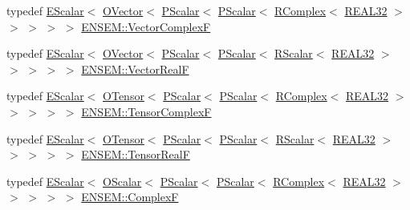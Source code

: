 \begin{DoxyCompactItemize}
\item 
typedef \mbox{\hyperlink{classENSEM_1_1EScalar}{E\+Scalar}}$<$ \mbox{\hyperlink{classENSEM_1_1OVector}{O\+Vector}}$<$ \mbox{\hyperlink{classENSEM_1_1PScalar}{P\+Scalar}}$<$ \mbox{\hyperlink{classENSEM_1_1PScalar}{P\+Scalar}}$<$ \mbox{\hyperlink{classENSEM_1_1RComplex}{R\+Complex}}$<$ \mbox{\hyperlink{namespaceENSEM_a7540d01191172323e9073283d772576d}{R\+E\+A\+L32}} $>$ $>$ $>$ $>$ $>$ \mbox{\hyperlink{group__defs_ga6a0a527d27235e5a8e8f28342eb7676f}{E\+N\+S\+E\+M\+::\+Vector\+ComplexF}}
\item 
typedef \mbox{\hyperlink{classENSEM_1_1EScalar}{E\+Scalar}}$<$ \mbox{\hyperlink{classENSEM_1_1OVector}{O\+Vector}}$<$ \mbox{\hyperlink{classENSEM_1_1PScalar}{P\+Scalar}}$<$ \mbox{\hyperlink{classENSEM_1_1PScalar}{P\+Scalar}}$<$ \mbox{\hyperlink{classENSEM_1_1RScalar}{R\+Scalar}}$<$ \mbox{\hyperlink{namespaceENSEM_a7540d01191172323e9073283d772576d}{R\+E\+A\+L32}} $>$ $>$ $>$ $>$ $>$ \mbox{\hyperlink{group__defs_gaa81b1a62c5846ad0db2fe60ff8f1e1b3}{E\+N\+S\+E\+M\+::\+Vector\+RealF}}
\item 
typedef \mbox{\hyperlink{classENSEM_1_1EScalar}{E\+Scalar}}$<$ \mbox{\hyperlink{classENSEM_1_1OTensor}{O\+Tensor}}$<$ \mbox{\hyperlink{classENSEM_1_1PScalar}{P\+Scalar}}$<$ \mbox{\hyperlink{classENSEM_1_1PScalar}{P\+Scalar}}$<$ \mbox{\hyperlink{classENSEM_1_1RComplex}{R\+Complex}}$<$ \mbox{\hyperlink{namespaceENSEM_a7540d01191172323e9073283d772576d}{R\+E\+A\+L32}} $>$ $>$ $>$ $>$ $>$ \mbox{\hyperlink{group__defs_ga7bcf210bf1e9c23606254944d97046d0}{E\+N\+S\+E\+M\+::\+Tensor\+ComplexF}}
\item 
typedef \mbox{\hyperlink{classENSEM_1_1EScalar}{E\+Scalar}}$<$ \mbox{\hyperlink{classENSEM_1_1OTensor}{O\+Tensor}}$<$ \mbox{\hyperlink{classENSEM_1_1PScalar}{P\+Scalar}}$<$ \mbox{\hyperlink{classENSEM_1_1PScalar}{P\+Scalar}}$<$ \mbox{\hyperlink{classENSEM_1_1RScalar}{R\+Scalar}}$<$ \mbox{\hyperlink{namespaceENSEM_a7540d01191172323e9073283d772576d}{R\+E\+A\+L32}} $>$ $>$ $>$ $>$ $>$ \mbox{\hyperlink{group__defs_ga36a49616408973774f501cbb3964c160}{E\+N\+S\+E\+M\+::\+Tensor\+RealF}}
\item 
typedef \mbox{\hyperlink{classENSEM_1_1EScalar}{E\+Scalar}}$<$ \mbox{\hyperlink{classENSEM_1_1OScalar}{O\+Scalar}}$<$ \mbox{\hyperlink{classENSEM_1_1PScalar}{P\+Scalar}}$<$ \mbox{\hyperlink{classENSEM_1_1PScalar}{P\+Scalar}}$<$ \mbox{\hyperlink{classENSEM_1_1RComplex}{R\+Complex}}$<$ \mbox{\hyperlink{namespaceENSEM_a7540d01191172323e9073283d772576d}{R\+E\+A\+L32}} $>$ $>$ $>$ $>$ $>$ \mbox{\hyperlink{group__defs_ga9d343936e63ca257d34c7e2198e549d7}{E\+N\+S\+E\+M\+::\+ComplexF}}

\end{DoxyCompactItemize}

